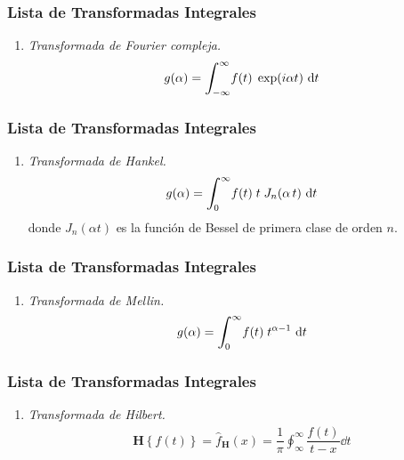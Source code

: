 \documentclass[12pt]{beamer}
\begin{document}
\begin{frame}
\frametitle{Lista de Transformadas Integrales}
\begin{enumerate}[<+->]
\conti
\item \emph{Transformada de Fourier compleja.}
\begin{align}
g (\alpha)= \scaleint{6ex}_{\bs -\infty}^{\infty} f (t) \; \exp(i \alpha t) \, \dd{t}
\label{eq:ecuacion_7_04}
\end{align}
\seti
\end{enumerate}
\end{frame}
\begin{frame}
\frametitle{Lista de Transformadas Integrales}
\begin{enumerate}[<+->]
\conti
\item \emph{Transformada de Hankel.}
\begin{align}
g (\alpha)= \scaleint{6ex}_{\bs 0}^{\infty} f (t) \; t \; J_{n} (\alpha \, t) \, \dd{t}
\label{eq:ecuacion_7_05}
\end{align}
donde $J_{n} (\alpha t)$ es la función de Bessel de primera clase de orden $n$.
\seti
\end{enumerate}
\end{frame}
\begin{frame}
\frametitle{Lista de Transformadas Integrales}
\begin{enumerate}[<+->]
\conti
\item \emph{Transformada de Mellin.}
\begin{align}
g (\alpha)= \scaleint{6ex}_{\bs 0}^{\infty} f (t) \; t^{\alpha-1} \, \dd{t}
\label{eq:ecuacion_7_06}
\end{align}
\seti
\end{enumerate}
\end{frame}
\begin{frame}
\frametitle{Lista de Transformadas Integrales}
\begin{enumerate}[<+->]
\conti
\item \emph{Transformada de Hilbert.}
\begin{align}
\mathbf{H} \left\{ f (t) \right\} = \hat{f}_{\mathbf{H}} (x) = \dfrac{1}{\pi} \oint_{\infty}^{\infty} \dfrac{f (t)}{t - x} \dd{t}
\label{eq:ecuacion_9_2_1}
\end{align}
\seti
\end{enumerate}
\end{frame}
\end{document}
